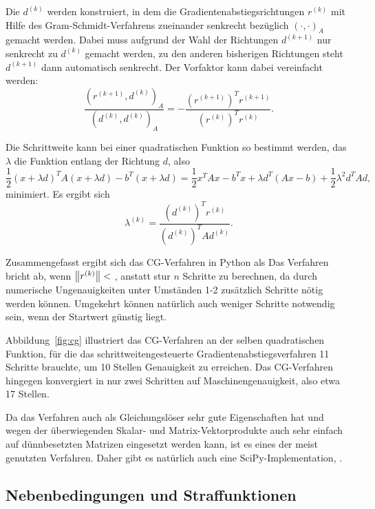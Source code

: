 Die $d^{(k)}$ werden konstruiert, in dem die
Gradientenabstiegsrichtungen $r^{(k)}$ mit Hilfe des
Gram-Schmidt-Verfahrens zueinander senkrecht bezüglich
$(\cdot,\cdot)_A$ gemacht werden. Dabei muss aufgrund der Wahl der
Richtungen $d^{(k+1)}$ nur senkrecht zu $d^{(k)}$ gemacht werden, zu
den anderen bisherigen Richtungen steht $d^{(k+1)}$ dann automatisch
senkrecht. Der Vorfaktor kann dabei vereinfacht werden:
\begin{equation}
  \frac{(r^{(k+1)}, d^{(k)})_A}{(d^{(k)}, d^{(k)})_A}
  = -\frac{\left(r^{(k+1)}\right)^Tr^{(k+1)}}{\left(r^{(k)}\right)^Tr^{(k)}}.
\end{equation}

Die Schrittweite kann bei einer quadratischen Funktion so bestimmt
werden, das $\lambda$ die Funktion entlang der Richtung $d$, also
\begin{equation}
  \frac{1}{2}(x+\lambda d)^TA(x+\lambda d) - b^T(x+\lambda d)
  =  \frac{1}{2}x^TAx - b^Tx + \lambda d^T(Ax - b) + \frac{1}{2}\lambda^2 d^TAd,
\end{equation}
minimiert. Es ergibt sich
\begin{equation}
  \lambda^{(k)}  =  \frac{\left(d^{(k)}\right)^Tr^{(k)}}{\left(d^{(k)}\right)^TAd^{(k)}}.
\end{equation}

Zusammengefasst ergibt sich das CG-Verfahren in Python als
%
Das Verfahren bricht ab, wenn $\left\lVert{r^{(k)}}\right\rVert <$ , anstatt
stur $n$ Schritte zu berechnen, da durch numerische Ungenauigkeiten
unter Umständen 1-2 zusätzlich Schritte nötig werden können. Umgekehrt
können natürlich auch weniger Schritte notwendig sein, wenn der
Startwert günstig liegt.

Abbildung~\ref{fig:cg} illustriert das CG-Verfahren an der selben
quadratischen Funktion, für die das schrittweitengesteuerte
Gradientenabstiegsverfahren 11 Schritte brauchte, um 10 Stellen
Genauigkeit zu erreichen. Das CG-Verfahren hingegen konvergiert in nur
zwei Schritten auf Maschinengenauigkeit, also etwa 17 Stellen.

Da das Verfahren auch als Gleichungslöser sehr gute Eigenschaften hat
und wegen der überwiegenden Skalar- und Matrix-Vektorprodukte auch
sehr einfach auf dünnbesetzten Matrizen eingesetzt werden kann, ist es
eines der meist genutzten Verfahren. Daher gibt es natürlich auch eine
SciPy-Implementation, .

\subsection{Nebenbedingungen und Straffunktionen}

